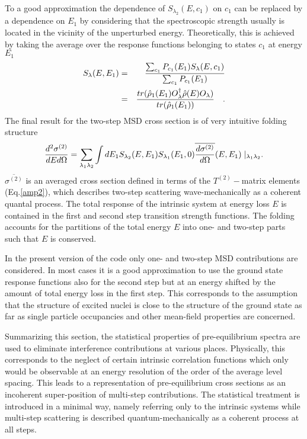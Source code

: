 To a good approximation the dependence of $S_{\lambda_{2}}(E,c_{1})$ on $%
c_{1}$ can be replaced by a dependence on $E_{1}$ by considering that the
spectroscopic strength usually is located in the vicinity of the unperturbed
energy. Theoretically, this is achieved by taking the average over the
response functions belonging to states $c_{1}$ at energy $E_{1}$
\begin{eqnarray}
S_{\lambda}(E,E_{1}) & = & \frac{\sum_{c_{1}}{P_{c_{1}}(E_{1})S_{%
\lambda}(E,c_{1})}}{\sum_{c_{1}}{P_{c_{1}}(E_{1})}}  \nonumber \\
& = & \frac{tr(\hat{\rho}_{1}(E_{1})O_{\lambda}^{\dag}\hat{\rho}%
(E)O_{\lambda})}{tr(\hat{\rho}_{1}(E_{1}))}\quad.  \label{slave}
\end{eqnarray}
\noindent The final result for the two-step MSD%
 cross section is of very intuitive folding structure
\begin{equation}
\frac{d^{2}\sigma^{(2)}}{dEd\Omega}=\sum_{\lambda_{1}\lambda_{2}}{\int
dE_{1}S_{\lambda_{2}}(E,E_{1})S_{\lambda_{1}}(E_{1},0)\overline{\frac{%
d\sigma^{(2)}}{d\Omega}}(E,E_{1})\mid_{\lambda_{1}\lambda_{2}}}.
\label{sigma2}
\end{equation}
\noindent $\overline{\sigma^{(2)}}$ is an averaged cross section defined in
terms of the $T^{(2)}-$matrix elements (Eq.\ref{amp2}), which describes
two-step scattering wave-mechanically as a coherent quantal process. The
total response of the intrinsic system at energy loss $E$ is contained in
the first and second step transition strength functions. The folding
accounts for the partitions of the total energy $E$ into one- and two-step
parts such that $E$ is conserved.

In the present version of the code only one- and two-step MSD%
 contributions are considered. In most cases it is a good
approximation to use the ground state response functions also for the second
step but at an energy shifted by the amount of total energy loss in the
first step. This corresponds to the assumption that the structure of excited
nuclei is close to the structure of the ground state as far as single
particle occupancies and other mean-field properties are concerned.

Summarizing this section, the statistical properties of pre-equilibrium
spectra are used to eliminate interference contributions at various places.
Physically, this corresponds to the neglect of certain intrinsic correlation
functions which only would be observable at an energy resolution of the
order of the average level spacing. This leads to a representation of
pre-equilibrium cross sections as an incoherent super-position of multi-step
contributions. The statistical treatment is introduced in a minimal way,
namely referring only to the intrinsic systems while multi-step scattering
is described quantum-mechanically as a coherent process at all steps.

